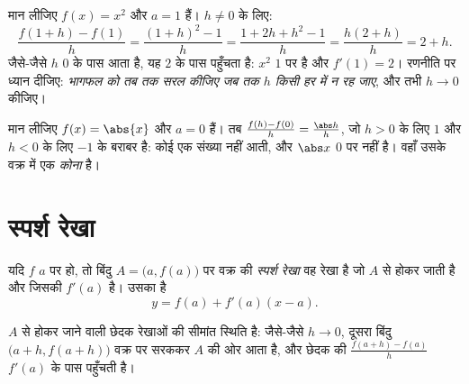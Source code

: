 \begin{example}\label{ex:g11:deriv:atpoint}
मान लीजिए $f(x) = x^2$ और $a = 1$ हैं। $h \neq 0$ के लिए:
\[
\frac{f(1+h) - f(1)}{h}
= \frac{(1+h)^2 - 1}{h}
= \frac{1 + 2h + h^2 - 1}{h}
= \frac{h(2 + h)}{h}
= 2 + h .
\]
जैसे-जैसे $h$ $0$ के पास आता है, यह $2$ के पास पहुँचता है:  $x^2$ $1$
पर  है और $f'(1) = 2$। रणनीति पर ध्यान दीजिए: \emph{भागफल को तब तक सरल
कीजिए जब तक $h$ किसी हर में न रह जाए}, और तभी $h \to 0$ कीजिए।
\end{example}

\begin{example}[एक अनवकलनीय बिंदु]
मान लीजिए $f(x) = \abs{x}$ और $a = 0$ हैं। तब $\frac{f(h) - f(0)}{h} = \frac{\abs h}{h}$, जो $h > 0$ के लिए $1$ और $h < 0$ के लिए
$-1$ के बराबर है: कोई एक संख्या नहीं आती, और $\abs x$ $0$ पर  नहीं है।
वहाँ उसके वक्र में एक \emph{कोना} है।
\end{example}

\section{स्पर्श रेखा}

\begin{definition}[स्पर्श रेखा]\label{def:g11:deriv:tangent}
यदि $f$ $a$ पर  हो, तो बिंदु $A = \bigl(a, f(a)\bigr)$ पर वक्र की \emph{स्पर्श
रेखा} वह रेखा है जो $A$ से होकर जाती है और जिसकी 
$f'(a)$ है। उसका  है
\[
y = f(a) + f'(a)(x - a).
\]
\end{definition}

 $A$ से होकर जाने वाली छेदक रेखाओं की सीमांत स्थिति है: जैसे-जैसे
$h \to 0$, दूसरा बिंदु $\bigl(a+h, f(a+h)\bigr)$ वक्र पर सरककर $A$ की ओर आता है, और छेदक की 
$\frac{f(a+h)-f(a)}{h}$ $f'(a)$ के पास पहुँचती है।

